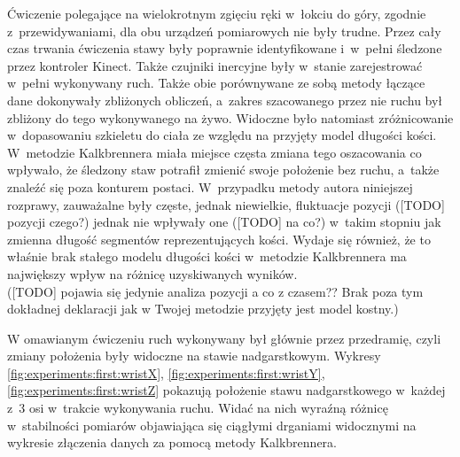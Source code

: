 Ćwiczenie polegające na wielokrotnym zgięciu ręki w~łokciu do góry, zgodnie z~przewidywaniami, dla obu urządzeń pomiarowych nie były trudne. Przez cały czas trwania ćwiczenia stawy były poprawnie identyfikowane i~w~pełni śledzone przez kontroler Kinect. Także czujniki inercyjne były w~stanie zarejestrować w~pełni  wykonywany ruch. Także obie porównywane ze sobą metody łączące dane dokonywały zbliżonych obliczeń, a~zakres szacowanego przez nie ruchu był zbliżony do tego wykonywanego na żywo. Widoczne było natomiast zróżnicowanie w~dopasowaniu szkieletu do ciała ze względu na przyjęty model długości kości. W~metodzie Kalkbrennera miała miejsce częsta zmiana tego oszacowania co wpływało, że śledzony staw potrafił zmienić swoje położenie bez ruchu, a~także znaleźć się poza konturem postaci. W~przypadku metody autora niniejszej rozprawy, zauważalne były częste, jednak niewielkie, fluktuacje pozycji ([TODO] pozycji czego?) jednak nie wpływały one ([TODO] na co?) w~takim stopniu jak zmienna długość segmentów reprezentujących kości. Wydaje się również, że to właśnie brak stałego modelu długości kości w~metodzie Kalkbrennera ma największy wpływ na różnicę uzyskiwanych wyników.\\
([TODO] pojawia się jedynie analiza pozycji a co z czasem?? Brak poza tym dokładnej deklaracji jak w Twojej metodzie przyjęty jest model kostny.)

W omawianym ćwiczeniu ruch wykonywany był głównie przez przedramię, czyli zmiany położenia były widoczne na stawie nadgarstkowym. Wykresy \ref{fig:experiments:first:wristX}, \ref{fig:experiments:first:wristY},\ref{fig:experiments:first:wristZ} pokazują położenie stawu nadgarstkowego w~każdej z~3 osi w~trakcie wykonywania ruchu. Widać na nich wyraźną różnicę w~stabilności pomiarów objawiająca się ciągłymi drganiami widocznymi na wykresie złączenia danych za pomocą metody Kalkbrennera.


